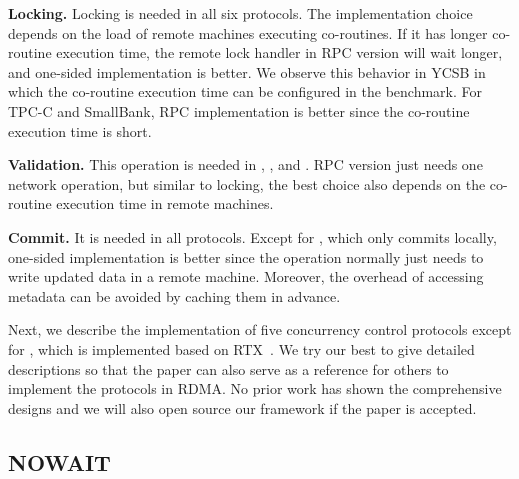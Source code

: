 {\bf Locking.} Locking is needed in all six protocols. The implementation choice depends on the load of remote machines executing co-routines. If it has longer co-routine
execution time, the remote lock handler in RPC version will wait longer, and one-sided implementation is better. 
We observe this behavior in YCSB 
in which the co-routine
execution time can be configured in the benchmark. 
For TPC-C and SmallBank, RPC implementation is better
since the co-routine execution time is short. 

{\bf Validation. } This operation is needed
in \occ, \mvcc, and \sundial.
RPC version just needs one network operation, 
but similar to locking, the best choice also depends on 
the co-routine execution time in remote machines. 


{\bf Commit. } It is needed in all protocols.
Except for \calvin, which only commits locally, one-sided 
implementation is better since the operation normally just needs to write updated data in a remote machine. Moreover, the overhead of accessing metadata can be avoided by caching them in advance.

Next, we describe the implementation 
of five concurrency control protocols except for \occ, which
is implemented based on RTX~\cite{wei2018deconstructing}.
We try our best to give detailed descriptions so that
the paper can also serve as a reference for others to implement 
the protocols in RDMA. No prior work has shown the comprehensive 
designs and we will also open source our framework if the paper is accepted. 








\subsection{NOWAIT}


